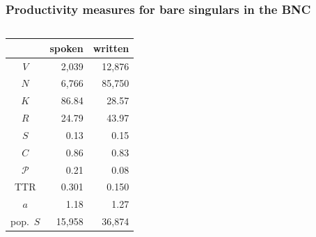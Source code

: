 \documentclass[t]{beamer} %
\begin{document}
\begin{frame}[c]
  \frametitle{Productivity measures for bare singulars in the BNC}

  \begin{columns}[c]
    \begin{column}{6cm}
      \centering
      \begin{tabular}{c@{$\qquad$}r@{$\qquad$}r}
        \toprule
        &    spoken &   written \\
        \midrule
        $V$     &  2,039 & 12,876 \\
        $N$     &  6,766 & 85,750 \\
        \midrule
        $K$     &    86.84 &    28.57 \\
        $R$     &    24.79 &    43.97 \\
        $S$     &     0.13 &     0.15 \\
        $C$     &     0.86 &     0.83 \\
        $\mathcal{P}$     &     0.21 &     0.08 \\
        TTR   &     0.301 &     0.150 \\
        $a$     &     1.18 &     1.27 \\
        pop.\ $S$ & 15,958 & 36,874 \\
        \bottomrule
      \end{tabular}
    \end{column}
    \begin{column}{6cm}
    \end{column}
  \end{columns}
\end{frame}
\end{document}
